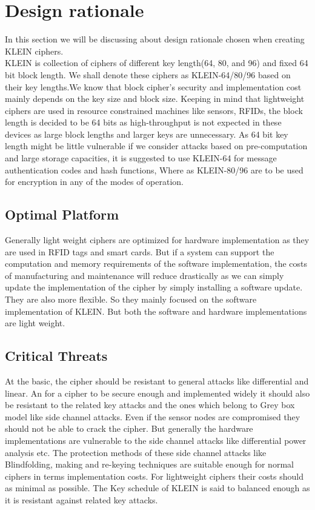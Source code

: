 \documentclass[preprint]{transcrypto}
\begin{document}
\section{Design rationale}
In this section we will be discussing about design rationale chosen when creating KLEIN ciphers.
\\
KLEIN is collection of ciphers of different key length(64, 80, and 96) and fixed 64 bit block length.
We shall denote these ciphers as KLEIN-64/80/96 based on their key lengths.We know that block cipher's security and implementation cost mainly depends on the key size and block size. Keeping in mind that lightweight ciphers are used in resource constrained machines like sensors, RFIDs, the block length is decided to be 64 bits as high-throughput is not expected in these devices as large block lengths and larger keys are unnecessary. As 64 bit key length might be little vulnerable if we consider attacks based on pre-computation and large storage capacities, it is suggested to use KLEIN-64 for message authentication codes and hash functions, Where as KLEIN-80/96 are to be used for encryption in any of the modes of operation.\\

\subsection{Optimal Platform} Generally light weight ciphers are optimized for hardware implementation as they are used in RFID tags and smart cards. But if a system can support the computation and memory requirements of the software implementation, the costs of manufacturing and maintenance will reduce drastically as we can simply update the implementation of the cipher by simply installing a software update. They are also more flexible. So they mainly focused on the software implementation of KLEIN. 
But both the software and hardware implementations are light weight.\\
\subsection{Critical Threats}
At the basic, the cipher should be resistant to general attacks like differential and linear. An for a cipher to be secure enough and implemented widely it should also be resistant to the related key attacks and the ones which belong to Grey box model like side channel attacks. Even if the sensor nodes are compromised they should not be able to crack the cipher. But generally the hardware implementations are vulnerable to the side channel attacks like differential power analysis etc. The protection methods of these side channel attacks like Blindfolding, making and re-keying techniques are suitable enough for normal ciphers in terms implementation costs. For lightweight ciphers their costs should as minimal as possible. The Key schedule of KLEIN is said to balanced enough as it is resistant against related key attacks. \\
\end{document}
